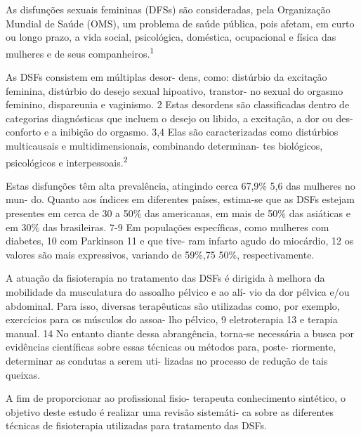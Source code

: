 \begin{multicols}{3}

\par{}As disfunções sexuais femininas (DFSs) são
consideradas, pela Organização Mundial de
Saúde (OMS), um problema de saúde pública,
pois afetam, em curto ou longo prazo, a vida
social, psicológica, doméstica, ocupacional e
física das mulheres e de seus companheiros.\textsuperscript{1}
\par{}As DSFs consistem em múltiplas desor-
dens, como: distúrbio da excitação feminina,
distúrbio do desejo sexual hipoativo, transtor-
no sexual do orgasmo feminino, dispareunia e
vaginismo. 2 Estas desordens são classificadas
dentro de categorias diagnósticas que incluem
o desejo ou libido, a excitação, a dor ou des-
conforto e a inibição do orgasmo. 3,4 Elas são
caracterizadas como distúrbios multicausais e
multidimensionais, combinando determinan-
tes biológicos, psicológicos e interpessoais.\textsuperscript{2}
\par{}Estas disfunções têm alta prevalência,
atingindo cerca 67,9\% 5,6 das mulheres no mun-
do. Quanto aos índices em diferentes países,
estima-se que as DSFs estejam presentes em
cerca de 30 a 50\% das americanas, em mais de
50\% das asiáticas e em 30\% das brasileiras. 7-9
Em populações específicas, como mulheres
com diabetes, 10 com Parkinson 11 e que tive-
ram infarto agudo do miocárdio, 12 os valores
são mais expressivos, variando de 59\%,75%
50\%, respectivamente.
\par{}A atuação da fisioterapia no tratamento
das DSFs é dirigida à melhora da mobilidade
da musculatura do assoalho pélvico e ao alí-
vio da dor pélvica e/ou abdominal. Para isso,
diversas terapêuticas são utilizadas como, por
exemplo, exercícios para os músculos do assoa-
lho pélvico, 9 eletroterapia 13 e terapia manual. 14
No entanto diante dessa abrangência, torna-se
necessária a busca por evidências científicas
sobre essas técnicas ou métodos para, poste-
riormente, determinar as condutas a serem uti-
lizadas no processo de redução de tais queixas.


\par{}A fim de proporcionar ao profissional fisio-
terapeuta conhecimento sintético, o objetivo
deste estudo é realizar uma revisão sistemáti-
ca sobre as diferentes técnicas de fisioterapia
utilizadas para tratamento das DSFs.



\end{multicols}
